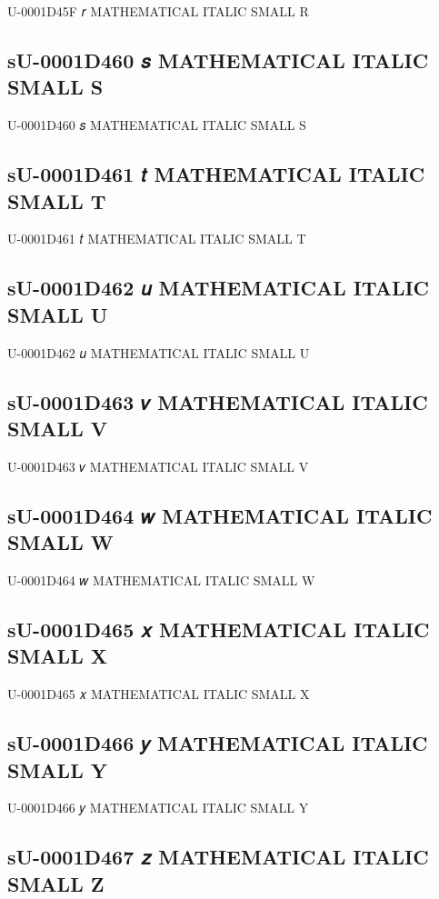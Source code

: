U-0001D45F 𝑟 MATHEMATICAL ITALIC SMALL R

\subsection{sU-0001D460 𝑠 MATHEMATICAL ITALIC SMALL S}

U-0001D460 𝑠 MATHEMATICAL ITALIC SMALL S

\subsection{sU-0001D461 𝑡 MATHEMATICAL ITALIC SMALL T}

U-0001D461 𝑡 MATHEMATICAL ITALIC SMALL T

\subsection{sU-0001D462 𝑢 MATHEMATICAL ITALIC SMALL U}

U-0001D462 𝑢 MATHEMATICAL ITALIC SMALL U

\subsection{sU-0001D463 𝑣 MATHEMATICAL ITALIC SMALL V}

U-0001D463 𝑣 MATHEMATICAL ITALIC SMALL V

\subsection{sU-0001D464 𝑤 MATHEMATICAL ITALIC SMALL W}

U-0001D464 𝑤 MATHEMATICAL ITALIC SMALL W

\subsection{sU-0001D465 𝑥 MATHEMATICAL ITALIC SMALL X}

U-0001D465 𝑥 MATHEMATICAL ITALIC SMALL X

\subsection{sU-0001D466 𝑦 MATHEMATICAL ITALIC SMALL Y}

U-0001D466 𝑦 MATHEMATICAL ITALIC SMALL Y

\subsection{sU-0001D467 𝑧 MATHEMATICAL ITALIC SMALL Z}


